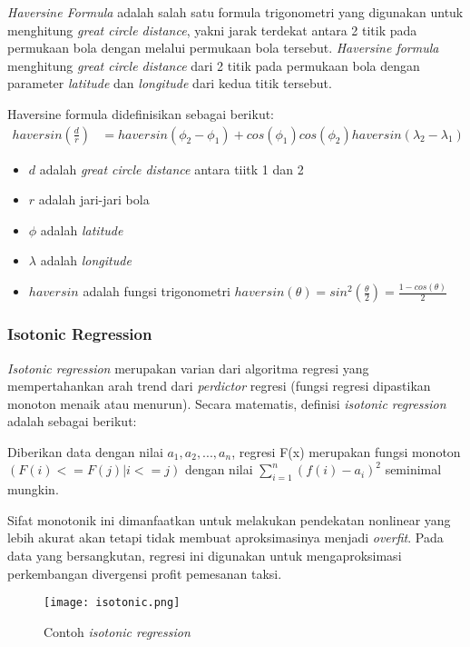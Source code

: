 \documentclass{article}
\begin{document}
\begin{adjustwidth}{4em}{0pt}
	
\hspace{\parindent}\textit{Haversine Formula} adalah salah satu formula trigonometri yang digunakan untuk menghitung \textit{great circle distance}, yakni jarak terdekat antara 2 titik pada permukaan bola dengan melalui permukaan bola tersebut. \textit{Haversine formula} menghitung \textit{great circle distance} dari 2 titik pada permukaan bola dengan parameter \textit{latitude} dan \textit{longitude} dari kedua titik tersebut.

Haversine formula didefinisikan sebagai berikut:
\begin{align*}
haversin(\frac{d}{r}) &= haversin(\phi _{2} - \phi _{1}) + cos(\phi _{1})cos(\phi _{2})haversin(\lambda _{2} - \lambda _{1})
\end{align*}
\begin{itemize}
	\setlength{\itemindent}{1cm}
	\item{$d$ adalah \textit{great circle distance} antara tiitk 1 dan 2}
	\item{$r$ adalah jari-jari bola}
	\item{$\phi$ adalah \textit{latitude}}
	\item{$\lambda$ adalah \textit{longitude}}
	\item{$haversin$ adalah fungsi trigonometri $haversin(\theta) = sin^2(\frac{\theta}{2}) = \frac{1-cos(\theta)}{2}$}
\end{itemize}

\end{adjustwidth}

\subsubsection{Isotonic Regression}
\begin{adjustwidth}{4em}{0pt}
	
\hspace{\parindent}\textit{Isotonic regression} merupakan varian dari algoritma regresi yang mempertahankan arah trend dari \textit{perdictor} regresi (fungsi regresi dipastikan monoton menaik atau menurun). Secara matematis, definisi \textit{isotonic regression} adalah sebagai berikut:

Diberikan data dengan nilai $a_1,a_2,...,a_n$, regresi F(x) merupakan fungsi monoton $(F(i) <= F(j) | i <= j)$  dengan nilai $\sum\limits_{i=1}^n({f(i)-a_{i}})^2$ seminimal mungkin.

Sifat monotonik ini dimanfaatkan untuk melakukan pendekatan  nonlinear yang lebih akurat akan tetapi tidak membuat aproksimasinya menjadi \textit{overfit}. Pada data yang bersangkutan, regresi ini digunakan untuk mengaproksimasi perkembangan divergensi profit pemesanan taksi.

\begin{figure}[H]
	\centering
	\texttt{[image: isotonic.png]}
	\caption{Contoh \textit{isotonic regression}}
\end{figure}

\end{adjustwidth}
\end{document}
